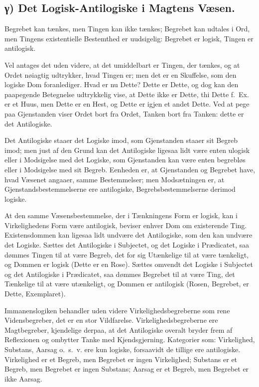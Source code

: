 \documentclass[12pt]{book}
\newcommand{\opage}[1]{\marginnote{\footnotesize\textit{[#1]}}}
\begin{document}
\subsection*{γ) Det Logisk-Antilogiske i Magtens Væsen.}

Begrebet kan tænkes, men Tingen kan ikke tænkes;
Begrebet kan udtales i Ord, men Tingens existentielle
Bestemthed er uudsigelig: Begrebet er logisk, Tingen er
antilogisk.

Vel antages det uden videre, at det umiddelbart er
Tingen, der tænkes, og at Ordet nøiagtig udtrykker, hvad
Tingen er; men det er en Skuffelse, som den logiske Dom
foranlediger. Hvad er nu Dette? Dette er Dette, og dog
kan den paapegende Betegnelse udtrykkelig vise, at Dette ikke
er Dette, thi Dette f.~Ex. er et Huus, men Dette er en
Hest, og Dette er igjen et andet Dette. Ved at pege paa
Gjenstanden viser Ordet bort fra Ordet, Tanken bort fra
Tanken: dette er det Antilogiske.

Det Antilogiske staaer det Logiske imod, som Gjenstanden
staaer sit Begreb imod; men just af den Grund kan det
Antilogiske ligesaa lidt være enten ulogisk eller i Modsigelse
med det Logiske, som Gjenstanden kan være enten begrebløs
eller i Modsigelse med sit Begreb. Eenheden er, at
Gjenstanden og Begrebet have, hvad Væsenet angaaer, samme
Bestemmelser; men Modsætningen er, at
Gjenstandsbestemmelserne ere antilogiske, Begrebsbestemmelserne derimod
logiske.

At den samme Væsensbestemmelse, der i Tænkningens
Form er logisk, kan i Virkelighedens Form være antilogisk,
beviser enhver Dom om existerende Ting. Existensdommen
kan ligesaa lidt undvære det Antilogiske, som den kan
undvære det Logiske. Sættes det Antilogiske i Subjectet, og
det Logiske i Prædicatet, saa dømmes Tingen til at være
Begreb, det for sig Utænkelige til at være tænkeligt, og
Dommen er logisk (Dette er en Rose). Sættes omvendt det
Logiske i Subjectet og det Antilogiske i Prædicatet, saa
\opage{29} dømmes Begrebet til at være Ting, det Tænkelige til at
være utænkeligt, og Dommen er antilogisk (Rosen, Begrebet,
er Dette, Exemplaret).

Immanenslogiken behandler uden videre
Virkelighedsbegreberne som rene Vidensbegreber, det er en stor
Vildfarelse. Virkelighedsbegreberne ere Magtbegreber, kjendelige
derpaa, at det Antilogiske overalt bryder frem af Reflexionen
og ombytter Tanke med Kjendsgjerning. Kategorier som:
Virkelighed, Substans, Aarsag o.~s.~v. ere kun logiske,
forsaavidt de tillige ere antilogiske. Virkelighed er et Begreb,
men Begrebet er ingen Virkelighed; Substans er et Begreb,
men Begrebet er ingen Substans; Aarsag er et Begreb,
men Begrebet er ikke Aarsag.
\end{document}
